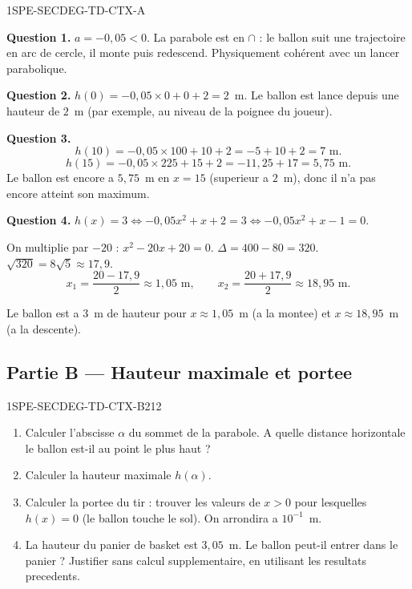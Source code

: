 \begin{corrige}{1SPE-SECDEG-TD-CTX-A}


\textbf{Question 1.} $a = -0{,}05 < 0$. La parabole est en $\cap$ : le ballon suit une trajectoire en arc de cercle, il monte puis redescend. Physiquement cohérent avec un lancer parabolique.

\textbf{Question 2.} $h(0) = -0{,}05 \times 0 + 0 + 2 = 2$~m. Le ballon est lance depuis une hauteur de $2$~m (par exemple, au niveau de la poignee du joueur).

\textbf{Question 3.}
\[
h(10) = -0{,}05 \times 100 + 10 + 2 = -5 + 10 + 2 = 7 \text{ m}.
\]
\[
h(15) = -0{,}05 \times 225 + 15 + 2 = -11{,}25 + 17 = 5{,}75 \text{ m}.
\]
Le ballon est encore a $5{,}75$~m en $x = 15$ (superieur a $2$~m), donc il n'a pas encore atteint son maximum.

\textbf{Question 4.} $h(x) = 3 \Leftrightarrow -0{,}05x^2 + x + 2 = 3 \Leftrightarrow -0{,}05x^2 + x - 1 = 0$.

On multiplie par $-20$ : $x^2 - 20x + 20 = 0$.
$\Delta = 400 - 80 = 320$. $\sqrt{320} = 8\sqrt{5} \approx 17{,}9$.
\[
x_1 = \frac{20 - 17{,}9}{2} \approx 1{,}05 \text{ m}, \qquad x_2 = \frac{20 + 17{,}9}{2} \approx 18{,}95 \text{ m}.
\]

Le ballon est a $3$~m de hauteur pour $x \approx 1{,}05$~m (a la montee) et $x \approx 18{,}95$~m (a la descente).

\end{corrige}

\bigskip

\subsection*{Partie B — Hauteur maximale et portee}

\begin{exercice}{1SPE-SECDEG-TD-CTX-B}{2}{12}
\begin{enumerate}
  \item Calculer l'abscisse $\alpha$ du sommet de la parabole.
    A quelle distance horizontale le ballon est-il au point le plus haut ?
  \item Calculer la hauteur maximale $h(\alpha)$.
  \item Calculer la portee du tir : trouver les valeurs de $x > 0$ pour lesquelles $h(x) = 0$
    (le ballon touche le sol). On arrondira a $10^{-1}$~m.
  \item La hauteur du panier de basket est $3{,}05$~m. Le ballon peut-il entrer dans le panier ?
    Justifier sans calcul supplementaire, en utilisant les resultats precedents.
\end{enumerate}
\end{exercice}

